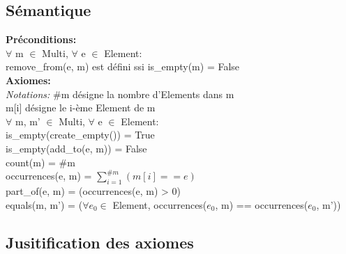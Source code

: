 \documentclass[a4paper, 11pt, oneside]{article}
\begin{document}
	\subsection{Sémantique}
	\noindent \textbf{Préconditions:}
	\\ \indent $\forall$ m $\in$ Multi, $\forall$ e $\in$ Element:
	\\ \indent \indent remove\_from(e, m) est défini ssi is\_empty(m) = False
	\\ \textbf{Axiomes:}
	\\ \indent \textit{Notations:} \#m désigne la nombre d'Elements dans m 
	\\ \indent \indent \indent \indent \indent m[i] désigne le i-ème Element de m
	\\ \indent $\forall$ m, m' $\in$ Multi, $\forall$ e $\in$ Element:
	\\ \indent \indent is\_empty(create\_empty()) = True
	\\ \indent \indent is\_empty(add\_to(e, m)) = False
	\\ \indent \indent count(m) = \#m
	\\ \indent \indent occurrences(e, m) = $\sum\limits_{i=1}^{\#m} (m[i] == e)$
	\\ \indent \indent part\_of(e, m) = (occurrences(e, m) > 0)
	\\ \indent \indent equals(m, m') = ($\forall e_{0} \in$ Element, occurrences($e_{0}$, m) == occurrences($e_{0}$, m'))
	
	\clearpage
	\subsection{Jusitification des axiomes}
\end{document}
